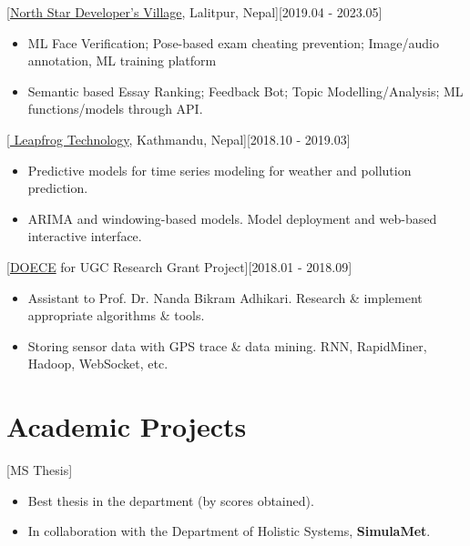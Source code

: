 \documentclass{resume}
\begin{document}
[\href{https://ublrandd.com.np/}{North Star Developer's Village}, Lalitpur, Nepal][2019.04 -  2023.05]
\begin{itemize}
   \item 	ML Face Verification; Pose-based exam cheating prevention; Image/audio annotation, ML training platform
   \item Semantic based Essay Ranking; Feedback Bot; Topic Modelling/Analysis; ML functions/models through API.
\end{itemize}

[\href{https://www.lftechnology.com/}{ Leapfrog Technology}, Kathmandu, Nepal][2018.10 - 2019.03]
\begin{itemize}
\item	Predictive models for time series modeling for weather and pollution prediction. 
\item ARIMA and windowing-based models. Model deployment and web-based interactive interface.
\end{itemize}

[\href{http://doece.pcampus.edu.np/}{DOECE} for UGC Research Grant Project][2018.01 - 2018.09]
\begin{itemize}
\item	Assistant to Prof. Dr. Nanda Bikram Adhikari. Research \& implement appropriate algorithms \& tools. 
\item Storing sensor data with GPS trace \& data mining. RNN, RapidMiner, Hadoop, WebSocket, etc. 

\end{itemize}








\section{Academic Projects}

[MS Thesis]
\begin{itemize}
\item Best thesis in the department (by scores obtained).
\item In collaboration with the Department of Holistic Systems, \textbf{SimulaMet}.
\end{itemize}
\end{document}
